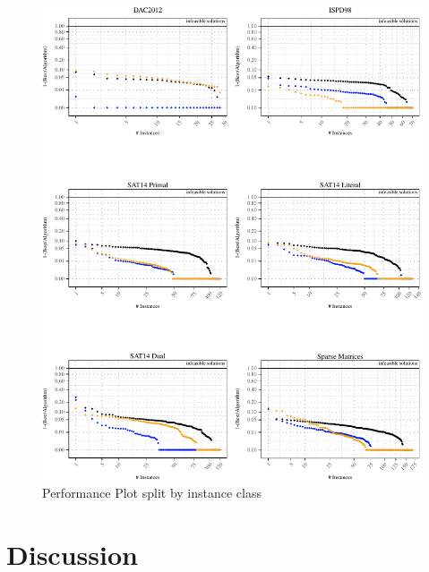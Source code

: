 \documentclass[a4paper,12pt,titlepage, BCOR7mm,headsepline]{scrbook}
\numberwithin{equation}{section}
\begin{document}
\begin{figure}[H]
\begin{center}
\includegraphics[width=\textwidth]{rnw/tuning_subset_plots/class_performance_plot-1}
\caption{Performance Plot split by instance class}
\label{fig:performanceplotclasses}
\end{center}
\end{figure}


\chapter{Discussion}
\label{chapter:discussion}
\end{document}
